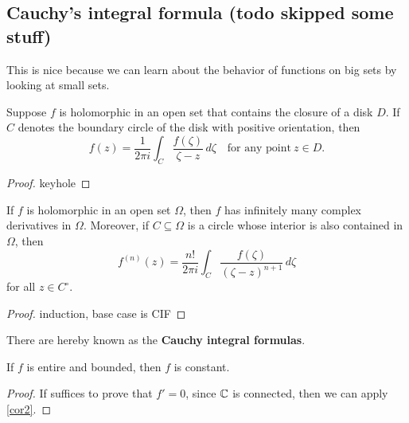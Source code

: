 \subsection{Cauchy's integral formula (todo skipped some stuff)}
This is nice because we can learn about the behavior of functions on big sets by looking at small sets.
\begin{theorem}\label{cif}
    Suppose $f$ is holomorphic in an open set that contains the closure of a disk $D$. If $C$ denotes the boundary circle of the disk with positive orientation, then \[
        f(z)=\frac{1}{2\pi i}\int_{C}^{} \frac{f(\zeta)}{\zeta-z} \, d\zeta \quad \text{for any point} \ z\in D.
    \] 
\end{theorem}
\begin{proof}
    keyhole
\end{proof}
\begin{cor}
    If $f$ is holomorphic in an open set $\Omega$, then $f$ has infinitely many complex derivatives in $\Omega$. Moreover, if $C\subseteq \Omega$ is a circle whose interior is also contained in $\Omega$, then \[
        f^{(n)}(z)=\frac{n!}{2\pi i}\int_{C}^{}\frac{f(\zeta)}{(\zeta-z)^{n+1}}  \, d\zeta
    \] for all $z\in C^{\circ }$.
\end{cor}
\begin{proof}
    induction, base case is CIF
\end{proof}
There are hereby known as the \textbf{Cauchy integral formulas}.
\begin{theorem}
    If $f$ is entire and bounded, then $f$ is constant.
\end{theorem}
\begin{proof}
    If suffices to prove that $f'=0$, since $\mathbb{C}$ is connected, then we can apply \cref{cor2}.
\end{proof}








